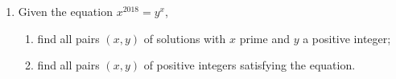 \documentclass{article}
\begin{document}
\begin{enumerate}[1.]
\vspace{6pt}
\item %
Given the equation $x^{2018} = y^x$,
\begin{enumerate}
  \item find all pairs $(x,y)$ of solutions with $x$ prime and $y$ a positive integer;
  \item find all pairs $(x,y)$ of positive integers satisfying the equation.
\end{enumerate}

\end{enumerate}


\vfill
\begin{center}
\begin{BVerbatim}

\end{BVerbatim}
\end{center}
\end{document}
